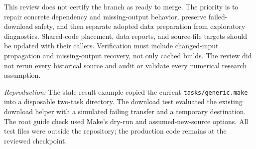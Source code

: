 This review does not certify the branch as ready to merge. The priority is to repair concrete dependency and missing-output behavior, preserve failed-download safety, and then separate adopted data preparation from exploratory diagnostics. Shared-code placement, data reports, and source-file targets should be updated with their callers. Verification must include changed-input propagation and missing-output recovery, not only cached builds. The review did not rerun every historical source and audit or validate every numerical research assumption.

\textit{Reproduction:} The stale-result example copied the current
\texttt{tasks/generic.make} into a disposable two-task directory. The download test evaluated the existing download helper with a simulated failing transfer and a temporary destination. The root guide check used Make's dry-run and assumed-new-source options. All test files were outside the repository; the production code remains at the reviewed checkpoint.
